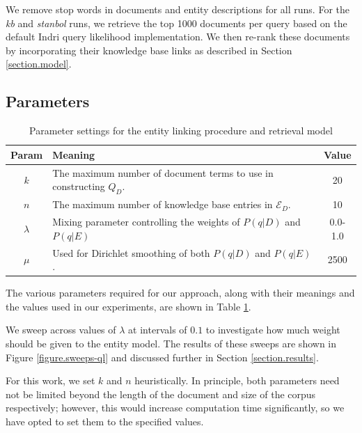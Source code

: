 \documentclass{sig-alternate}
\begin{document}
We remove stop words in documents and entity descriptions for all runs. For the \textit{kb} and \textit{stanbol} runs, we retrieve the top 1000 documents per query based on the default Indri query likelihood implementation. We then re-rank these documents by incorporating their knowledge base links as described in Section \ref{section.model}.

\subsection{Parameters}\label{section.evaluation.parameters}

\begin{table}[htbp]
\centering
\begin{tabular}{|c|p{}|c|} \hline
{\bf Param} & {\bf Meaning} & {\bf Value} \\ \hline
$k$ & The maximum number of document terms to use in constructing $Q_D$. & 20 \\ \hline
$n$ & The maximum number of knowledge base entries in $\mathcal{E}_D$. & 10 \\ \hline
$\lambda$ & Mixing parameter controlling the weights of $P(q|D)$ and $P(q|E)$ & 0.0-1.0 \\ \hline
$\mu$ & Used for Dirichlet smoothing of both $P(q|D)$ and $P(q|E)$. & 2500 \\ \hline
\end{tabular}
\caption{Parameter settings for the entity linking procedure and retrieval model}
\label{table.parameters}
\end{table}

The various parameters required for our approach, along with their meanings and the values used in our experiments, are shown in Table \ref{table.parameters}. 

We sweep across values of $\lambda$ at intervals of $0.1$ to investigate how much weight should be given to the entity model. The results of these sweeps are shown in Figure \ref{figure.sweeps-ql} and discussed further in Section \ref{section.results}.

For this work, we set $k$ and $n$ heuristically. In principle, both parameters need not be limited beyond the length of the document and size of the corpus respectively; however, this would increase computation time significantly, so we have opted to set them to the specified values.
\end{document}
